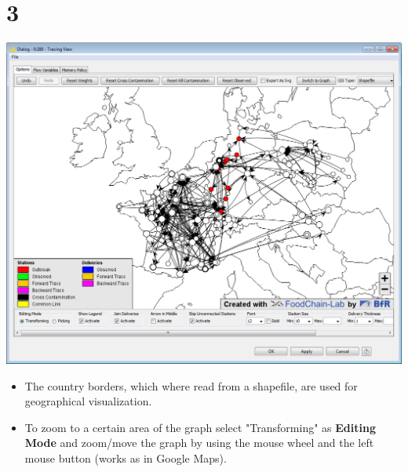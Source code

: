 \documentclass{beamer}
\begin{document}
\section{3}
\begin{frame}
	\begin{center}
  		\includegraphics[height=0.6\textheight]{3.png}
	\end{center}
	\begin{itemize}
		\item The country borders, which where read from a shapefile, are used for geographical visualization.
		\item To zoom to a certain area of the graph select "Transforming" as \textbf{Editing Mode} and zoom/move the graph by using the mouse wheel and the left mouse button (works as in Google Maps).
		\it
	\end{itemize}
\end{frame}
\end{document}
